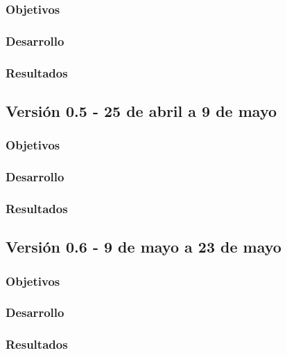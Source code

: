 \subsubsection{Objetivos}

\subsubsection{Desarrollo}

\subsubsection{Resultados}

\subsection{Versión 0.5 - 25 de abril a 9 de mayo}

\subsubsection{Objetivos}

\subsubsection{Desarrollo}

\subsubsection{Resultados}

\subsection{Versión 0.6 - 9 de mayo a 23 de mayo}

\subsubsection{Objetivos}

\subsubsection{Desarrollo}

\subsubsection{Resultados}
